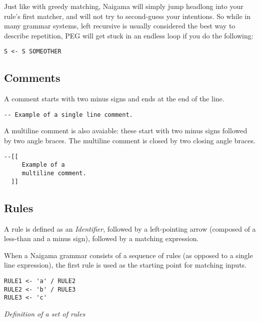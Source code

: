 Just like with greedy matching, Naigama will simply jump headlong
into your rule's first matcher, and will not try to second-guess your
intentions. So while in many grammar systems, left recursive is
usually considered the best way to describe
repetition, PEG will get stuck in an endless loop if you do the following:

\begin{myquote}
\begin{verbatim}
S <- S SOMEOTHER
\end{verbatim}
\end{myquote}

\subsection{Comments}

A comment starts with two minus signs and ends at the end of the line.

\begin{myquote}
\begin{verbatim}
-- Example of a single line comment.
\end{verbatim}
\end{myquote}

A multiline comment is also avaiable: these start with two minus signs
followed by two angle braces. The multiline comment is closed by two
closing angle braces.

\begin{myquote}
\begin{verbatim}
--[[
     Example of a
     multiline comment.
  ]]
\end{verbatim}
\end{myquote}

\subsection{Rules}

A rule is defined as an \textit{Identifier}, followed by a
left-pointing arrow (composed of a less-than and a minus sign),
followed by a matching expression.

When a Naigama grammar consists of a sequence of rules
(as opposed to a single line expression),
the first rule is used as the starting point for matching inputs.

\begin{myquote}
\begin{verbatim}
RULE1 <- 'a' / RULE2
RULE2 <- 'b' / RULE3
RULE3 <- 'c'
\end{verbatim}
\end{myquote}
\textit{Definition of a set of rules}

